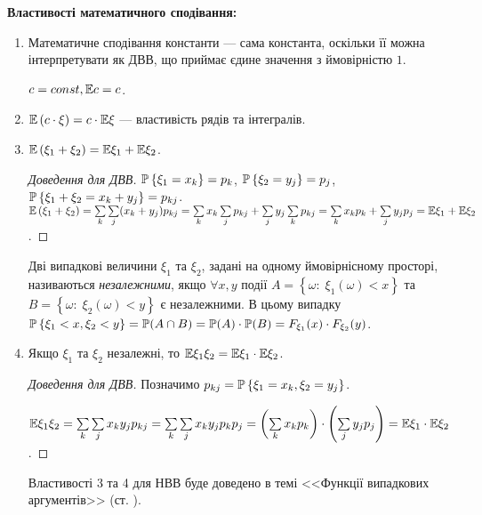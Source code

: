 \noindent \textbf{Властивості математичного сподівання:}
\begin{enumerate}
    \item Математичне сподівання константи --- сама константа, оскільки
    її можна інтерпретувати як ДВВ, що приймає єдине значення з ймовірністю $1$.
    
    $c = const, \E c = c$.
    \item $\E \left(c\cdot\xi\right) = c\cdot \E\xi$ --- властивість рядів та інтегралів.
    \item $\E\left( \xi_1 + \xi_2\right) = \E\xi_1 + \E\xi_2$.
    \begin{proof}[Доведення для ДВВ]
        $\P\left\{\xi_1 = x_k\right\} = p_k$, $\P\left\{\xi_2 = y_j\right\} = p_j$, $\P\left\{\xi_1 + \xi_2 = x_k + y_j\right\} = p_{kj}$.
        $\E\left( \xi_1 + \xi_2\right) = \sum\limits_k \sum\limits_j (x_k+y_j) p_{kj} =
        \sum\limits_k x_k \sum\limits_j p_{kj} + \sum\limits_j y_j \sum\limits_k p_{kj} = \sum\limits_k x_k p_k + \sum\limits_j y_j p_j = \E\xi_1 + \E\xi_2$.
    \end{proof}
\begin{definition}
    Дві випадкові величини $\xi_1$ та $\xi_2$, задані на одному ймовірнісному просторі, називаються \emph{незалежними}, якщо
    $\forall x, y$ події $A=\left\{\omega : \; \xi_1(\omega) < x\right\}$ та
    $B=\left\{\omega : \; \xi_2(\omega) < y\right\}$ є незалежними.
    В цьому випадку $\P\left\{\xi_1 < x, \xi_2 < y\right\} = \P(A \cap B) = \P(A)\cdot \P(B) = F_{\xi_1}(x)\cdot F_{\xi_2}(y)$.
\end{definition}
    \item Якщо $\xi_1$ та $\xi_2$ незалежні, то $\E\xi_1\xi_2 = \E\xi_1 \cdot \E\xi_2$.
    \begin{proof}[Доведення для ДВВ]
        Позначимо $p_{kj} = \P\left\{\xi_1 = x_k, \xi_2 = y_j\right\}$.
        
        $\E\xi_1\xi_2 = \sum\limits_k \sum\limits_j x_k y_j p_{kj} = \sum\limits_k \sum\limits_j x_k y_j p_k p_j = \left( \sum\limits_k x_k p_k\right)\cdot \left( \sum\limits_j y_j p_j\right) = \E\xi_1 \cdot \E\xi_2$.
    \end{proof}
    Властивості 3 та 4 для НВВ буде доведено в темі <<Функції випадкових аргументів>> (ст. \pageref{proof:expectation}).
\end{enumerate}

